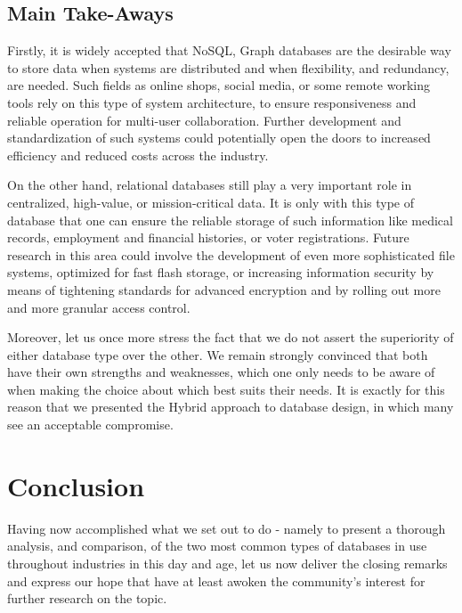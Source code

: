 \documentclass[10pt,        %
               a4paper,     %
               journal,     %
               ]{IEEEtran}
\begin{document}
\subsection{Main Take-Aways}
Firstly, it is widely accepted that NoSQL, Graph databases are the desirable way to store data  when systems are distributed and when flexibility, and redundancy, are needed. Such fields as online shops, social media, or some remote working tools rely on this type of system architecture, to ensure responsiveness and reliable operation for multi-user collaboration. Further development and standardization of such systems could potentially open the doors to increased efficiency and reduced costs across the industry. \par
On the other hand, relational databases still play a very important role in centralized, high-value, or mission-critical data. It is only with this type of database that one can ensure the reliable storage of such information like medical records, employment and financial histories, or voter registrations. Future research in this area could involve the development of even more sophisticated file systems, optimized for fast flash storage, or increasing information security by means of tightening standards for advanced encryption and by rolling out more and more granular access control. \par 
Moreover, let us once more stress the fact that we do not assert the superiority of either database type over the other. We remain strongly convinced that both have their own strengths and weaknesses, which one only needs to be aware of when making the choice about which best suits their needs. It is exactly for this reason that we presented the Hybrid approach to database design, in which many see an acceptable compromise. \par

\section{Conclusion}
Having now accomplished what we set out to do - namely to present a thorough analysis, and comparison, of the two most common types of databases in use throughout industries in this day and age, let us now deliver the closing remarks and express our hope that have at least awoken the community's interest for further research on the topic. 
\end{document}
